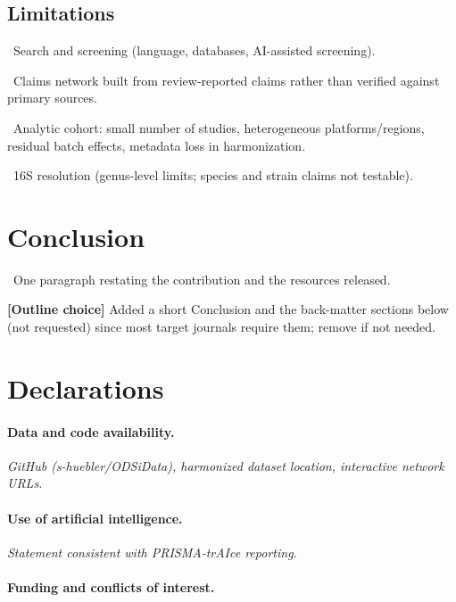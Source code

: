 \documentclass[11pt,a4paper]{article}
\newcommand{\todoitem}[1]{\par\noindent\textcolor{blue!70!black}{\textbullet~#1}}
\newcommand{\placeholder}[1]{\par\medskip\noindent\colorbox{gray!15}{\parbox{\dimexpr\linewidth-2\fboxsep}{%
  \small\textit{#1}}}\par\medskip}
\newcommand{\choice}[1]{\par\noindent\textcolor{magenta!80!black}{\small\textbf{[Outline choice]} #1}\par}
\begin{document}
\subsection{Limitations}
\label{sec:limitations}
\todoitem{Search and screening (language, databases, AI-assisted screening).}
\todoitem{Claims network built from review-reported claims rather than verified against primary sources.}
\todoitem{Analytic cohort: small number of studies, heterogeneous platforms/regions, residual batch effects, metadata loss in harmonization.}
\todoitem{16S resolution (genus-level limits; species and strain claims not testable).}


\section{Conclusion}
\label{sec:conclusion}
\todoitem{One paragraph restating the contribution and the resources released.}
\choice{Added a short Conclusion and the back-matter sections below (not requested) since most target journals require them; remove if not needed.}


\section*{Declarations}
\paragraph{Data and code availability.}\mbox{}
\placeholder{GitHub (s-huebler/ODSiData), harmonized dataset location, interactive network URLs.}
\paragraph{Use of artificial intelligence.}\mbox{}
\placeholder{Statement consistent with PRISMA-trAIce reporting.}
\paragraph{Funding and conflicts of interest.}\mbox{}
\placeholder{}

\printbibliography


\appendix
\end{document}
